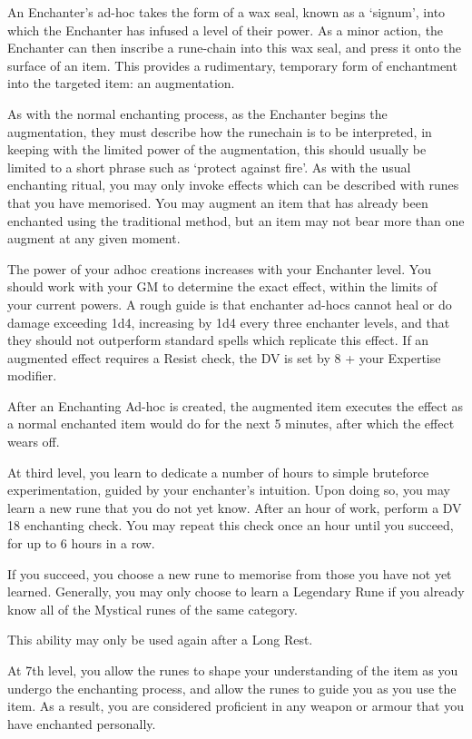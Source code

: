 {
An Enchanter's ad-hoc takes the form of a wax seal, known as a `signum', into which the Enchanter has infused a level of their power. As a minor action, the Enchanter can then inscribe a rune-chain into this wax seal, and press it onto the surface of an item. This provides a rudimentary, temporary form of enchantment into the targeted item: an augmentation. 
 
As with the normal enchanting process, as the Enchanter begins the augmentation, they must describe how the runechain is to be interpreted, in keeping with the limited power of the augmentation, this should usually be limited to a short phrase such as `protect against fire'. As with the usual enchanting ritual, you may only invoke effects which can be described with runes that you have memorised. You may augment an item that has already been enchanted using the traditional method, but an item may not bear more than one augment at any given moment. 

The power of your ad\minus{}hoc creations increases with your Enchanter level. You should work with your GM to determine the exact effect, within the limits of your current powers. A rough guide is that enchanter ad-hocs cannot heal or do damage exceeding 1d4, increasing by 1d4 every three enchanter levels, and that they should not outperform standard spells which replicate this effect. If an augmented effect requires a Resist check, the DV is set by 8 + your Expertise modifier. 
	 
After an Enchanting Ad-hoc is created, the augmented item executes the effect as a normal enchanted item would do for the next 5 minutes, after which the effect wears off.  
}

{
	At third level, you learn to dedicate a number of hours to simple brute\minus{}force experimentation, guided by your enchanter's intuition. Upon doing so, you may learn a new rune that you do not yet know. After an hour of work, perform a DV 18 enchanting check. You may repeat this check once an hour until you succeed, for up to 6 hours in a row.

	If you succeed, you choose a new rune to memorise from those you have not yet learned. Generally, you may only choose to learn a Legendary Rune if you already know all of the Mystical runes of the same category.  

	This ability may only be used again after a Long Rest.
}

{
	At 7th level, you allow the runes to shape your understanding of the item as you undergo the enchanting process, and allow the runes to guide you as you use the item. As a result, you are considered proficient in any weapon or armour that you have enchanted personally.
}

